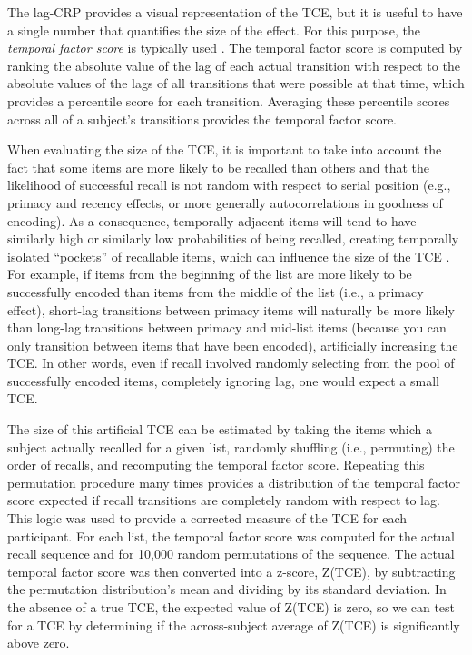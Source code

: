 \documentclass[man,natbib,floatsintext]{apa6} %
\begin{document}
The lag-CRP provides a visual representation of the TCE, but it is useful to have a single number that quantifies the size of the effect. For this purpose, the \emph{temporal factor score} is typically used \citep{SedeEtal10,PolyEtal09}. The temporal factor score is computed by ranking the absolute value of the lag of each actual transition with respect to the absolute values of the lags of all transitions that were possible at that time, which provides a percentile score for each transition. Averaging these percentile scores across all of a subject's transitions provides the temporal factor score.
 
When evaluating the size of the TCE, it is important to take into account the fact that some items are more likely to be recalled than others and that the likelihood of successful recall is not random with respect to serial position (e.g., primacy and recency effects, or more generally autocorrelations in goodness of encoding). As a consequence, temporally adjacent items will tend to have similarly high or similarly low probabilities of being recalled, creating temporally isolated ``pockets'' of recallable items, which can influence the size of the TCE \citep{Hint16,SedeEtal10}. For example, if items from the beginning of the list are more likely to be successfully encoded than items from the middle of the list (i.e., a primacy effect), short-lag transitions between primacy items will naturally be more likely than long-lag transitions between primacy and mid-list items (because you can only transition between items that have been encoded), artificially increasing the TCE. In other words, even if recall involved randomly selecting from the pool of successfully encoded items, completely ignoring lag, one would expect a small TCE.

The size of this artificial TCE can be estimated by taking the items which a subject actually recalled for a given list, randomly shuffling (i.e., permuting) the order of recalls, and recomputing the temporal factor score. Repeating this permutation procedure many times provides a distribution of the temporal factor score expected if recall transitions are completely random with respect to lag. This logic was used to provide a corrected measure of the TCE for each participant. For each list, the temporal factor score was computed for the actual recall sequence and for 10,000 random permutations of the sequence.
The actual temporal factor score was then converted into a z-score, Z(TCE), by subtracting the permutation distribution's mean and dividing by its standard deviation. In the absence of a true TCE, the expected value of Z(TCE) is zero, so we can test for a TCE by determining if the across-subject average of Z(TCE) is significantly above zero.
\end{document}
